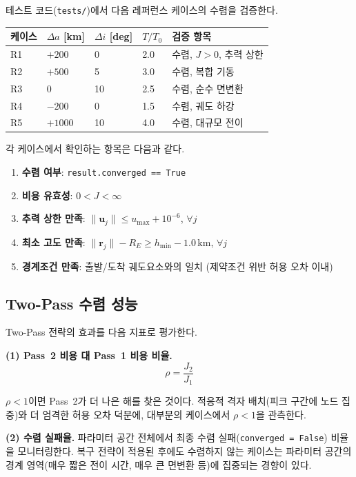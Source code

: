 \documentclass[11pt]{article}
\begin{document}
테스트 코드(\texttt{tests/})에서 다음 레퍼런스 케이스의 수렴을 검증한다.

\begin{table}[h]
\centering
\begin{tabular}{@{}lllll@{}}
\toprule
케이스 & $\Delta a$ [km] & $\Delta i$ [deg] & $T/T_0$ & 검증 항목 \\
\midrule
R1 & $+200$ & 0 & 2.0 & 수렴, $J > 0$, 추력 상한 \\
R2 & $+500$ & 5 & 3.0 & 수렴, 복합 기동 \\
R3 & 0 & 10 & 2.5 & 수렴, 순수 면변환 \\
R4 & $-200$ & 0 & 1.5 & 수렴, 궤도 하강 \\
R5 & $+1000$ & 10 & 4.0 & 수렴, 대규모 전이 \\
\bottomrule
\end{tabular}
\end{table}

각 케이스에서 확인하는 항목은 다음과 같다.

\begin{enumerate}[leftmargin=*]
  \item \textbf{수렴 여부}: \texttt{result.converged == True}
  \item \textbf{비용 유효성}: $0 < J < \infty$
  \item \textbf{추력 상한 만족}: $\|\mathbf{u}_j\| \leq u_{\max} + 10^{-6}$, $\forall j$
  \item \textbf{최소 고도 만족}: $\|\mathbf{r}_j\| - R_E \geq h_{\min} - 1.0$\,km, $\forall j$
  \item \textbf{경계조건 만족}: 출발/도착 궤도요소와의 일치 (제약조건 위반 허용 오차 이내)
\end{enumerate}

\subsection{Two-Pass 수렴 성능}

Two-Pass 전략의 효과를 다음 지표로 평가한다.

\textbf{(1) Pass~2 비용 대 Pass~1 비용 비율.}
%
\begin{equation}\label{eq:cost-ratio}
\rho = \frac{J_2}{J_1}
\end{equation}

$\rho < 1$이면 Pass~2가 더 나은 해를 찾은 것이다. 적응적 격자 배치(피크 구간에 노드 집중)와 더 엄격한 허용 오차 덕분에, 대부분의 케이스에서 $\rho < 1$을 관측한다.

\textbf{(2) 수렴 실패율.} 파라미터 공간 전체에서 최종 수렴 실패(\texttt{converged = False}) 비율을 모니터링한다. 복구 전략이 적용된 후에도 수렴하지 않는 케이스는 파라미터 공간의 경계 영역(매우 짧은 전이 시간, 매우 큰 면변환 등)에 집중되는 경향이 있다.
\end{document}
